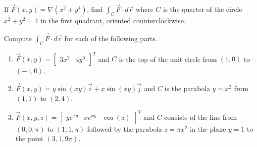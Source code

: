 \documentclass[12pt,reqno]{amsart}
\begin{document}
\prob If $\vec{F}(x,y) = \nabla (x^2+y^4)$, find $\int_C \vec{F} \cdot d\vec{r}$ where $C$ is the quarter of the circle $x^2+y^2=4$ in the first quadrant, oriented counterclockwise.

\vfill
\prob Compute $\int_C \vec{F} \cdot d \vec{r}$ for each of the following parts.

\bigskip
\begin{enumerate}
\item $\vec{F}(x,y) = \begin{bmatrix} 3x^2 & 4y^3\end{bmatrix}^T$ and $C$ is the top of the unit circle from $(1,0)$ to $(-1,0)$.\vfill\newpage
\item $\vec{F}(x,y) = y\sin{(xy)}\vec{i} + x\sin{(xy)}\vec{j}$ and $C$ is the parabola $y=x^2$ from $(1,1)$ to $(2,4)$.\vfill
\item $\vec{F}(x,y,z) = \begin{bmatrix} ye^{xy} & x e^{xy} & \cos{(z)}\end{bmatrix}^T$ and $C$ consists of the line from $(0,0,\pi)$ to $(1,1,\pi)$ followed by the parabola $z=\pi x^2$ in the plane $y=1$ to the point $(3,1,9\pi)$.\vfill
\end{enumerate}
\end{document}
